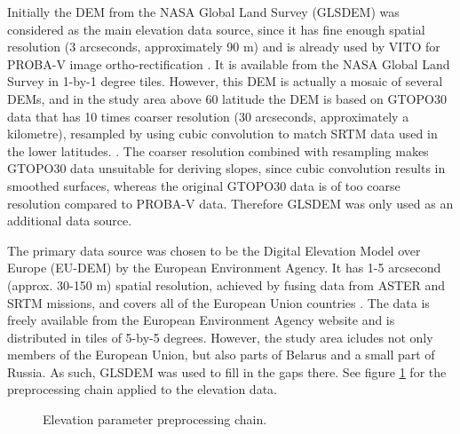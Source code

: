 \documentclass[a4paper,12pt]{scrbook}
\begin{document}
Initially the DEM from the NASA Global Land Survey (GLSDEM) was considered as the main elevation data source, since it has fine enough spatial resolution (3 arcseconds, approximately 90 m) and is already used by VITO for PROBA-V image ortho-rectification \citep{probavguide}. It is available from the NASA Global Land Survey in 1-by-1 degree tiles. However, this DEM is actually a mosaic of several DEMs, and in the study area above 60\textdegree{} latitude the DEM is based on GTOPO30 data that has 10 times coarser resolution (30 arcseconds, approximately a kilometre), resampled by using cubic convolution to match SRTM data used in the lower latitudes. \citep{glsdemtechguide}. The coarser resolution combined with resampling makes GTOPO30 data unsuitable for deriving slopes, since cubic convolution results in smoothed surfaces, whereas the original GTOPO30 data is of too coarse resolution compared to PROBA-V data. Therefore GLSDEM was only used as an additional data source.

The primary data source was chosen to be the Digital Elevation Model over Europe (EU-DEM) by the European Environment Agency. It has 1-5 arcsecond (approx. 30-150 m) spatial resolution, achieved by fusing data from ASTER and SRTM missions, and covers all of the European Union countries \citep{bashfield2011eudem}. The data is freely available from the European Environment Agency website and is distributed in tiles of 5-by-5 degrees. However, the study area icludes not only members of the European Union, but also parts of Belarus and a small part of Russia. As such, GLSDEM was used to fill in the gaps there. See figure \ref{fig-elevation-preprocessing} for the preprocessing chain applied to the elevation data.

\begin{figure}
  \centering
  \caption{Elevation parameter preprocessing chain.}
  \label{fig-elevation-preprocessing}
\end{figure}
\end{document}
